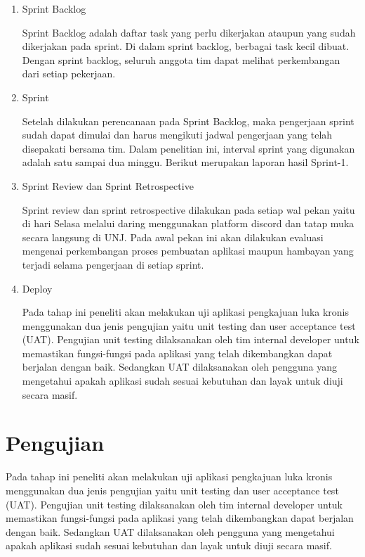 \begin{enumerate}
\item Sprint Backlog

Sprint Backlog adalah daftar task yang perlu dikerjakan ataupun yang sudah dikerjakan pada sprint. Di dalam sprint backlog, berbagai task kecil dibuat. Dengan sprint backlog, seluruh anggota tim dapat melihat perkembangan dari setiap pekerjaan.

\item Sprint

Setelah dilakukan perencanaan pada Sprint Backlog, maka pengerjaan sprint sudah dapat dimulai dan harus mengikuti jadwal pengerjaan yang telah disepakati bersama tim. Dalam penelitian ini, interval sprint yang digunakan adalah satu sampai dua minggu. Berikut merupakan laporan hasil Sprint-1.
	
	
\item Sprint Review dan Sprint Retrospective
	
Sprint review dan sprint retrospective dilakukan pada setiap wal pekan yaitu di hari Selasa melalui daring menggunakan platform discord dan tatap muka secara langsung di UNJ. Pada awal pekan ini akan dilakukan evaluasi mengenai perkembangan proses pembuatan aplikasi maupun hambayan yang terjadi selama pengerjaan di setiap sprint.
	
\item Deploy
	
Pada tahap ini peneliti akan melakukan uji aplikasi pengkajuan luka kronis menggunakan dua jenis pengujian yaitu unit testing dan user acceptance test (UAT). Pengujian unit testing dilaksanakan oleh tim internal developer untuk memastikan fungsi-fungsi pada aplikasi yang telah dikembangkan dapat berjalan dengan baik. Sedangkan UAT dilaksanakan oleh pengguna yang mengetahui apakah aplikasi sudah sesuai kebutuhan dan layak untuk diuji secara masif.
\end{enumerate}

\section{Pengujian}

Pada tahap ini peneliti akan melakukan uji aplikasi pengkajuan luka kronis menggunakan dua jenis pengujian yaitu unit testing dan user acceptance test (UAT). Pengujian unit testing dilaksanakan oleh tim internal developer untuk memastikan fungsi-fungsi pada aplikasi yang telah dikembangkan dapat berjalan dengan baik. Sedangkan UAT dilaksanakan oleh pengguna yang mengetahui apakah aplikasi sudah sesuai kebutuhan dan layak untuk diuji secara masif.


